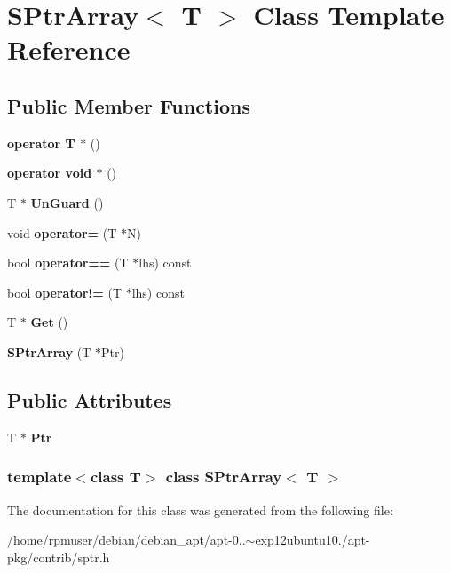 \section{\-S\-Ptr\-Array$<$ \-T $>$ \-Class \-Template \-Reference}
\label{classSPtrArray}
\subsection*{\-Public \-Member \-Functions}
\begin{DoxyCompactItemize}
\item 
{\bfseries operator T $\ast$} ()\label{classSPtrArray_a4e20322854ce5d78776cdaf1a87aacd9}

\item 
{\bfseries operator void $\ast$} ()\label{classSPtrArray_a0b32021b12206ef34495c688760c44bf}

\item 
\-T $\ast$ {\bfseries \-Un\-Guard} ()\label{classSPtrArray_a138f89ea209d517d530b808e524125e1}

\item 
void {\bfseries operator=} (\-T $\ast$\-N)\label{classSPtrArray_a4f37889697348747d7432d0e8368a7fd}

\item 
bool {\bfseries operator==} (\-T $\ast$lhs) const \label{classSPtrArray_a8039659521ab9ef2bb9ab69befd8792a}

\item 
bool {\bfseries operator!=} (\-T $\ast$lhs) const \label{classSPtrArray_ad28d3ead733e4eb4aa84e9e1e686fd8d}

\item 
\-T $\ast$ {\bfseries \-Get} ()\label{classSPtrArray_a9381b54160045cd20c4246fc8d23da10}

\item 
{\bfseries \-S\-Ptr\-Array} (\-T $\ast$\-Ptr)\label{classSPtrArray_a413911271b0a3bf97001bc8c410ea255}

\end{DoxyCompactItemize}
\subsection*{\-Public \-Attributes}
\begin{DoxyCompactItemize}
\item 
\-T $\ast$ {\bfseries \-Ptr}\label{classSPtrArray_a89d6013a0fce85f8d86599a3d328aac0}

\end{DoxyCompactItemize}
\subsubsection*{template$<$class \-T$>$ class S\-Ptr\-Array$<$ T $>$}



\-The documentation for this class was generated from the following file\-:\begin{DoxyCompactItemize}
\item 
/home/rpmuser/debian/debian\-\_\-apt/apt-\/0..$\sim$exp12ubuntu10./apt-\/pkg/contrib/sptr.\-h\end{DoxyCompactItemize}
